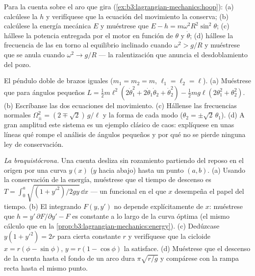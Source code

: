 \begin{exercise}[$\star\star$]\label{exo:b3:lagrangian-mechanics:9}
Para la cuenta sobre el aro que gira
(\cref{ex:b3:lagrangian-mechanics:hoop}): (a) calcúlese la 
$h$ y verifíquese que la ecuación del movimiento la conserva; (b) calcúlese la
energía mecánica $E$ y muéstrese que $E - h =
m\omega^2R^2\sin^2\theta$; (c) hállese la potencia entregada por el motor en
función de $\theta$ y $\dot\theta$; (d) hállese la frecuencia de las  en torno al equilibrio inclinado cuando $\omega^2 > g/R$ y
muéstrese que se anula cuando $\omega^2 \to g/R$ --- la ralentización que
anuncia el desdoblamiento del pozo.
\end{exercise}

\begin{exercise}[$\star\star\star$]\label{exo:b3:lagrangian-mechanics:10}
El péndulo doble de brazos iguales ($m_1 = m_2 = m$, $\ell_1 = \ell_2 = \ell$).
(a) Muéstrese que para ángulos pequeños $L = \tfrac12 m\ell^2(2\dot\theta_1^2 +
2\dot\theta_1\dot\theta_2 + \dot\theta_2^2) - \tfrac12 mg\ell(2
\theta_1^2 + \theta_2^2)$. (b) Escríbanse las dos ecuaciones del movimiento.
(c) Hállense las frecuencias normales $\Omega_\pm^2 = (2 \mp \sqrt2)\,g/\ell$ y
la forma de cada modo ($\theta_2 = \pm\sqrt2\,\theta_1$). (d) A gran
amplitud este sistema es un ejemplo clásico de caos: explíquese en unas líneas
qué rompe el análisis de ángulos pequeños y por qué no se pierde ninguna ley
de conservación.
\end{exercise}

\begin{exercise}[$\star\star\star$]\label{exo:b3:lagrangian-mechanics:11}
\emph{La braquistócrona.} Una cuenta desliza sin rozamiento partiendo del
reposo en el origen por una curva $y(x)$ ($y$ hacia abajo) hasta un punto
$(a, b)$. (a) Usando la conservación de la energía, muéstrese que el tiempo
de descenso es $T =
\int_0^a\sqrt{(1 + y'^2)/2gy}\,\dd x$ --- un funcional en el que $x$
desempeña el papel del tiempo. (b) El integrando $F(y, y')$ no depende
explícitamente de $x$: muéstrese que $h = y'\,\partial F/\partial y' - F$ es
constante a lo largo de la curva óptima (el mismo cálculo que en la
\cref{prop:b3:lagrangian-mechanics:energy}). (c) Dedúzcase $y(1 + y'^2) =
2r$ para cierta constante $r$ y verifíquese que la cicloide $x = r(\phi -
\sin\phi)$, $y = r(1 - \cos\phi)$ la satisface. (d) Muéstrese que el
descenso de la cuenta hasta el fondo de un arco dura $\pi\sqrt{r/g}$ y
compárese con la rampa recta hasta el mismo punto.
\end{exercise}

